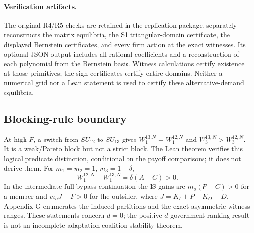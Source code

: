 \paragraph{Verification artifacts.}
The original R4/R5 checks are retained in the replication package.
 separately reconstructs
the matrix equilibria, the S1 triangular-domain certificate, the displayed
Bernstein certificates, and every firm action at the exact witnesses. Its
optional JSON output includes all rational coefficients and a reconstruction
of each polynomial from the Bernstein basis. Witness calculations certify
existence at those primitives; the sign certificates certify entire domains.
Neither a numerical grid nor a Lean statement is used to certify these
alternative-demand equilibria.

\subsection{Blocking-rule boundary}
At high $F$, a switch from $SU_{12}$ to $SU_{13}$ gives
$W_1^{13,N}=W_1^{12,N}$ and $W_3^{13,N}>W_3^{12,N}$.
It is a weak/Pareto block but not a strict block. The Lean theorem
 verifies this logical predicate
distinction, conditional on the payoff comparisons; it does not derive them.
For $m_1=m_2=1$, $m_3=1-\delta$,
\[
W_1^{12,N}-W_1^{13,N}=\delta(A-C)>0.
\]
In the intermediate full-bypass continuation the IS gains are
$m_o(P-C)>0$ for a member and $m_oJ+F>0$ for the outsider, where
$J=K_I+P-K_O-D$. Appendix G enumerates the induced partitions and
the exact asymmetric witness ranges. These statements concern $d=0$;
the positive-$d$ government-ranking result is not an incomplete-adaptation
coalition-stability theorem.
